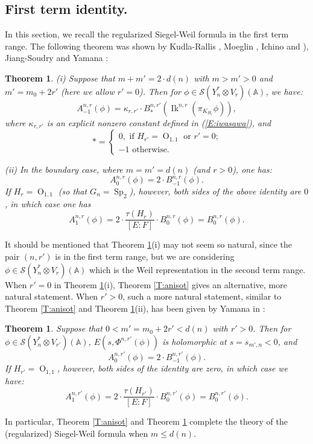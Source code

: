 \documentclass[10pt]{amsart}
\theoremstyle{plain}
\newtheorem{Thm}[equation]{Theorem}
\numberwithin{equation}{section}
\begin{document}
\subsection{\bf First term identity.}
 In this section, we recall the regularized Siegel-Weil formula in the
 first term range.  The following theorem was shown by Kudla-Rallis \cite{KR5}, Moeglin \cite{Mo}, Ichino
\cite[Theorem 3.1]{I1} and \cite[Theorems 4.1 and 4.2] {I2}), Jiang-Soudry \cite[Theorem 2.4]{JS}  and Yamana \cite[Proposition 5.8]{Y2}: 
\begin{Thm} \label{T:1st}
(i) Suppose that $m+ m' = 2 \cdot d(n)$ with $m > m'>0$ and
$m'=m_0+2r'$ (here we allow $r' = 0$).
 Then for $\phi \in \mathcal{S}(Y_n^* \otimes V_r)({\mathbb{A}})$, we have:
\[  
 A^{n,r}_{-1}(\phi) = \kappa_{r,r'}  \cdot
 B^{n,r'}_{\ast}({\operatorname{Ik}}^{n,r}(\pi_{K_{H_r}}\phi)),  
\]
where $\kappa_{r,r'}$ is an explicit nonzero constant defined in
(\ref{E:iwasawa}), and
\[  \ast = \begin{cases}
0, \text{  if $H_{r'} = {\operatorname{O}}_{1,1}$ or $r'=0$;} \\
-1 \text{  otherwise.} \end{cases} \]
\vskip 5pt

(ii) In the boundary case, where $m = m' = d(n)$ (and $r > 0$),  one
has:
\[ A^{n,r}_0(\phi)  = 2 \cdot B^{n,r}_{-1}(\phi) . \]
If $H_r = {\operatorname{O}}_{1,1}$ (so that $G_n = {\operatorname{Sp}}_2$), however, both sides of the above identity are $0$, in which case 
one has
\[ A^{n,r}_1(\phi)  = 2 \cdot \frac{\tau(H_r)}{[E:F]} \cdot B^{n,r}_{0}(\phi) = B^{n,r}_0(\phi). \]
\end{Thm}
\vskip 5pt

 
It should be mentioned that Theorem \ref{T:1st}(i)  may not seem so natural, since the pair $(n,r')$ is in the first
term range, but we are considering $\phi \in \mathcal{S}(Y_n^* \otimes
V_r)({\mathbb{A}})$ which is the Weil representation in the second term
range. When $r' = 0$ in Theorem \ref{T:1st}(i), Theorem \ref{T:anisot} gives  an alternative,  more natural statement. When $r' >0$, such a more natural statement, similar to Theorem \ref{T:anisot} and Theorem \ref{T:1st}(ii),  has been given by Yamana in \cite[Theorem 2.2]{Y2}:
\vskip 5pt

\begin{Thm}  \label{T:yamana}
Suppose that $0<m'=m_0+2r' <
d(n)$ with $r' >0$.  Then for $\phi \in  \mathcal{S}(Y_n^*
\otimes V_{r'})({\mathbb{A}})$, $E(s, \Phi^{n,r'}(\phi))$ is holomorphic at $s =
s_{m',n} < 0$,  and
\[   A_0^{n, r'}(\phi)  =    2\cdot B^{n,r'}_{-1}(\phi). \]
 If $H_{r'} = {\operatorname{O}}_{1,1}$, however, both sides of the identity are zero, in which case we have:
 \[   A_1^{n, r'}(\phi)  =  2 \cdot \frac{\tau(H_{r'})}{[E:F]}\cdot B^{n,r'}_0(\phi) = B^{n,r'}_0(\phi). \]
  \end{Thm}
 \vskip 5pt
 In particular, Theorem \ref{T:anisot} and Theorem \ref{T:yamana}
 complete  the theory of the (regularized) Siegel-Weil formula when
 $m \leq d(n)$.
 
\end{document}
